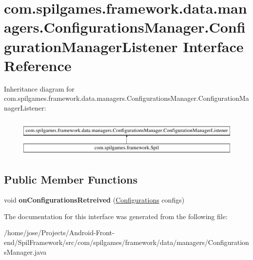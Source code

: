 \hypertarget{interfacecom_1_1spilgames_1_1framework_1_1data_1_1managers_1_1_configurations_manager_1_1_configuration_manager_listener}{\section{com.\-spilgames.\-framework.\-data.\-managers.\-Configurations\-Manager.\-Configuration\-Manager\-Listener Interface Reference}
\label{interfacecom_1_1spilgames_1_1framework_1_1data_1_1managers_1_1_configurations_manager_1_1_configuration_manager_listener}
}
Inheritance diagram for com.\-spilgames.\-framework.\-data.\-managers.\-Configurations\-Manager.\-Configuration\-Manager\-Listener\-:\begin{figure}[H]
\begin{center}
\leavevmode
\includegraphics[height=1.982301cm]{interfacecom_1_1spilgames_1_1framework_1_1data_1_1managers_1_1_configurations_manager_1_1_configuration_manager_listener}
\end{center}
\end{figure}
\subsection*{Public Member Functions}
\begin{DoxyCompactItemize}
\item 
\hypertarget{interfacecom_1_1spilgames_1_1framework_1_1data_1_1managers_1_1_configurations_manager_1_1_configuration_manager_listener_a47789df095102146c7c70340324d0ccc}{void {\bfseries on\-Configurations\-Retreived} (\hyperlink{classcom_1_1spilgames_1_1framework_1_1data_1_1_configurations}{Configurations} configs)}\label{interfacecom_1_1spilgames_1_1framework_1_1data_1_1managers_1_1_configurations_manager_1_1_configuration_manager_listener_a47789df095102146c7c70340324d0ccc}

\end{DoxyCompactItemize}


The documentation for this interface was generated from the following file\-:\begin{DoxyCompactItemize}
\item 
/home/jose/\-Projects/\-Android-\/\-Front-\/end/\-Spil\-Framework/src/com/spilgames/framework/data/managers/Configurations\-Manager.\-java\end{DoxyCompactItemize}
